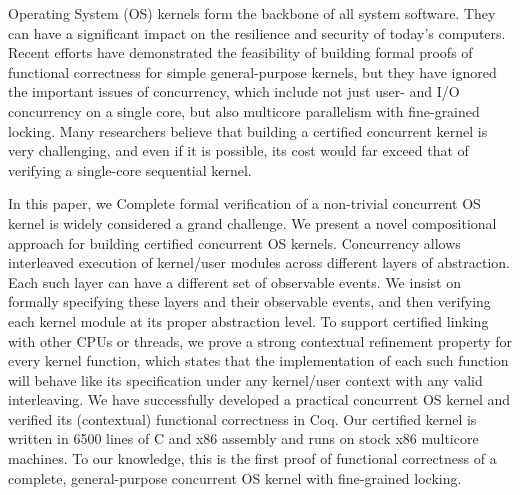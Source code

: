 \iflongabs
Operating System (OS) kernels form the backbone of all system
software. They can have a significant impact on the resilience
and security of today's computers. Recent efforts
have demonstrated the feasibility of building formal proofs of
functional correctness for simple general-purpose kernels, but they
have ignored the important issues of concurrency, which include not
just user- and I/O concurrency on a single core, but also
multicore parallelism with fine-grained locking.  Many 
researchers believe that building a certified concurrent kernel is
very challenging, and even if it is possible, its cost would far
exceed that of verifying a single-core sequential kernel.

In this paper, we 
\else
Complete formal verification of a non-trivial concurrent OS kernel is
widely considered a grand challenge.  We 
\fi
present a novel compositional approach for building certified
concurrent OS kernels. Concurrency allows interleaved execution of
kernel/user modules across different layers of abstraction. Each such
layer can have a different set of observable events. We insist on
formally specifying these layers and their observable events, and then
verifying each kernel module at its proper abstraction level. To
support certified linking with other CPUs or threads, we prove a
strong contextual refinement property for every kernel function, which
states that the implementation of each such function will behave like
its specification under any kernel/user context with any valid
interleaving. We have successfully developed a practical concurrent OS
kernel and verified its (contextual) functional correctness in Coq.
Our certified kernel is written in 6500 lines of C and x86 assembly
and runs on stock x86 multicore machines. To our knowledge, this is
the first proof of functional correctness of a complete,
general-purpose concurrent OS kernel with fine-grained locking.


